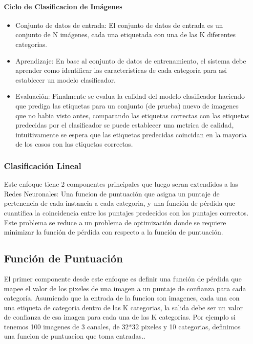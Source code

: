 \documentclass[a4paper,11pt,spanish]{book}
\begin{document}
	\paragraph {Ciclo de Clasificacion de Imágenes}
	  \begin{itemize}
	    \item Conjunto de datos de entrada: El conjunto de datos de entrada es un conjunto de N imágenes, cada una etiquetada con una de las K diferentes categorias.  
	    \item Aprendizaje: En base al conjunto de datos de entrenamiento, el sistema debe aprender como identificar las caracteristicas de cada categoria para asi establecer un modelo clasificador.
	    \item Evaluación: Finalmente se evalua la calidad del modelo clasificador haciendo que prediga las etiquetas para un conjunto (de prueba) nuevo de imagenes que no habia visto antes, comparando las 
	    etiquetas correctas con las etiquetas predecidas por el clasificador se puede establecer una metrica de calidad, intuitivamente se espera que las etiquetas predecidas coincidan en la mayoria
	    de los casos con las etiquetas correctas.
	  \end{itemize}
      
      \subsubsection{Clasificación Lineal}
	Este enfoque tiene 2 componentes principales que luego seran extendidos a las Redes Neuronales: Una funcion de puntuación que asigna un puntaje de pertenencia de cada instancia a cada categoria, 
	y una función de pérdida que cuantifica la coincidencia entre los puntajes predecidos con los puntajes correctos.
	Este problema se reduce a un problema de optimización donde se requiere minimizar la función de pérdida con respecto a la función de puntuación.

    \subsection{Función de Puntuación}
      El primer componente desde este enfoque es definir una función de pérdida que mapee el valor de los pixeles de una imagen a un puntaje de confianza para cada categoría.
      Asumiendo que la entrada de la funcion son imagenes, cada una con una etiqueta de categoria dentro de las K categorias, la salida debe ser un valor de confianza de esa imagen 
      para cada una de las K categorias.
    Por ejemplo si tenemos 100 imagenes de 3 canales, de 32*32 pixeles y 10 categorias, definimos una funcion de puntuacion que toma entradas..
\end{document}
